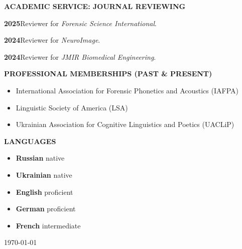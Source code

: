 \documentclass[11pt]{article}
\newcommand{\hangpara}{
 \setlength{\parindent}{0in} %
 \hangindent=0.42in %
}
\begin{document}
\vskip 20pt
\begin{flushleft}
{\bf ACADEMIC SERVICE: JOURNAL REVIEWING}
\end{flushleft}
\hangpara
{\bf 2025}\hspace{1ex}Reviewer for \textit{Forensic Science International}.
\vskip 6pt
\hangpara
{\bf 2024}\hspace{1ex}Reviewer for \textit{NeuroImage}.
\vskip 6pt
\hangpara
{\bf 2024}\hspace{1ex}Reviewer for \textit{JMIR Biomedical Engineering}.



\vskip 20pt
\begin{flushleft}
{\bf PROFESSIONAL MEMBERSHIPS (PAST \& PRESENT)}
\end{flushleft}
\begin{itemize}
\item International Association for Forensic Phonetics and Acoustics (IAFPA)
\item Linguistic Society of America (LSA)
\item Ukrainian Association for Cognitive Linguistics and Poetics (UACLiP)
\end{itemize}



\clearpage
\vskip 10pt
\begin{flushleft}
{\bf LANGUAGES}
\end{flushleft}
\begin{itemize}
\item {\bf Russian} native
\item {\bf Ukrainian} native
\item {\bf English} proficient
\item {\bf German} proficient
\item {\bf French} intermediate
\end{itemize}

\vskip 20pt
\today
\end{document}
